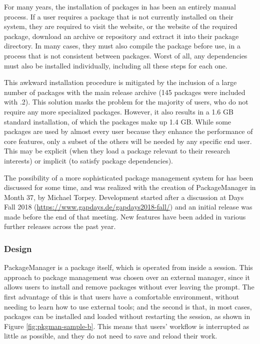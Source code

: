 For many years, the installation of packages in \GAP has been an entirely manual
process.  If a user requires a package that is not currently installed on their
system, they are required to visit the \GAP website, or the website of the
required package, download an archive or repository and extract it into their
package directory.  In many cases, they must also compile the package before
use, in a process that is not consistent between packages.  Worst of all, any
dependencies must also be installed individually, including all these steps for
each one.

This awkward installation procedure is mitigated by the inclusion of a large
number of packages with the main release archive (145 packages were included
with .2).  This solution masks the problem for the majority of users,
who do not require any more specialized packages.  However, it also results in a
1.6 GB standard installation, of which the packages make up 1.4 GB.  
While some packages are used by almost every \GAP user because they
enhance the performance of core \GAP features, 
only a subset of the others will be needed by any specific end
user. This may be explicit (when they load a package relevant to their
research interests) or implicit (to satisfy package dependencies).

The possibility of a more sophisticated package management system for \GAP has
been discussed for some time, and was realized with the creation of {\sf
  PackageManager} \cite{PackageManager} in
Month 37, by Michael Torpey.  Development started after a discussion at
\GAP Days Fall 2018 (\url{https://www.gapdays.de/gapdays2018-fall/}) and an
initial release was made before the end of that meeting.  New features have been
added in various further releases across the past year.


\subsubsection{Design}

{\sf PackageManager} is a \GAP package itself, which is operated from inside a
\GAP session.  This approach to package management was chosen over an external
manager, since it allows users to install and remove packages without ever
leaving the \GAP prompt.  The first advantage of this is that
users have a comfortable environment, without needing to learn how to use
external tools; and the second is that, in most cases, packages can be installed
and loaded without restarting the session, as shown in Figure \ref{fig:pkgman-sample-b}.
This means that users' workflow is interrupted as little as possible, and they do
not need to save and reload their work.


